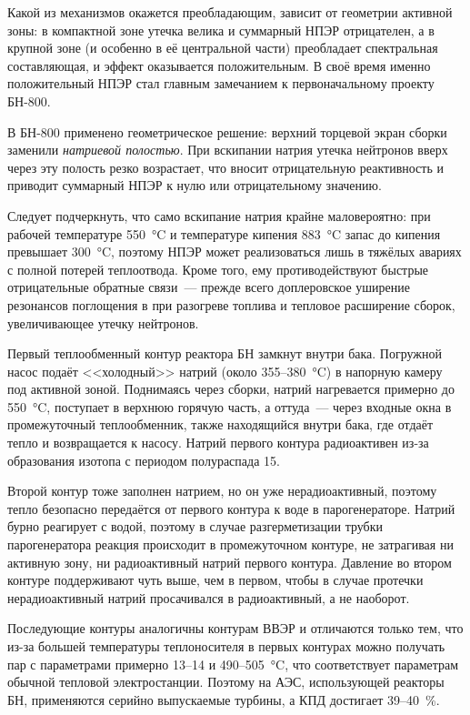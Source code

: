 Какой из механизмов окажется преобладающим, зависит от геометрии активной зоны: в компактной зоне утечка велика и суммарный НПЭР отрицателен, а в крупной зоне (и особенно в её центральной части) преобладает спектральная составляющая, и эффект оказывается положительным. В своё время именно положительный НПЭР стал главным замечанием к первоначальному проекту БН-800.

В БН-800 применено геометрическое решение: верхний торцевой экран сборки заменили \emph{натриевой полостью}. При вскипании натрия утечка нейтронов вверх через эту полость резко возрастает, что вносит отрицательную реактивность и приводит суммарный НПЭР к нулю или отрицательному значению.

Следует подчеркнуть, что само вскипание натрия крайне маловероятно: при рабочей температуре \qty{550}{\degreeCelsius} и температуре кипения \qty{883}{\degreeCelsius} запас до кипения превышает \qty{300}{\degreeCelsius}, поэтому НПЭР может реализоваться лишь в тяжёлых авариях с полной потерей теплоотвода. Кроме того, ему противодействуют быстрые отрицательные обратные связи~--- прежде всего доплеровское уширение резонансов поглощения в  при разогреве топлива и тепловое расширение сборок, увеличивающее утечку нейтронов.

Первый теплообменный контур реактора БН замкнут внутри бака. Погружной насос подаёт <<холодный>> натрий (около \num{355}--\qty{380}{\degreeCelsius}) в напорную камеру под активной зоной. Поднимаясь через сборки, натрий нагревается примерно до \qty{550}{\degreeCelsius}, поступает в верхнюю горячую часть, а оттуда~--- через входные окна в промежуточный теплообменник, также находящийся внутри бака, где отдаёт тепло и возвращается к насосу. Натрий первого контура радиоактивен из-за образования изотопа  с периодом полураспада \qty{15}{\ruCh}.

Второй контур тоже заполнен натрием, но он уже нерадиоактивный, поэтому тепло безопасно передаётся от первого контура к воде в парогенераторе. Натрий бурно реагирует с водой, поэтому в случае разгерметизации трубки парогенератора реакция происходит в промежуточном контуре, не затрагивая ни активную зону, ни радиоактивный натрий первого контура. Давление во втором контуре поддерживают чуть выше, чем в первом, чтобы в случае протечки нерадиоактивный натрий просачивался в радиоактивный, а не наоборот.

Последующие контуры аналогичны контурам ВВЭР и отличаются только тем, что из-за большей температуры теплоносителя в первых контурах можно получать пар с параметрами примерно \num{13}--\qty{14}{\ruMPa} и \num{490}--\qty{505}{\degreeCelsius}, что соответствует параметрам обычной тепловой электростанции. Поэтому на АЭС, использующей реакторы БН, применяются серийно выпускаемые турбины, а КПД достигает \num{39}--\qty{40}{\percent}.


